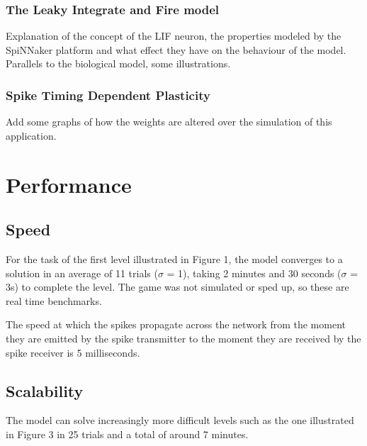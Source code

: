 \documentclass[10pt]{article}
\begin{document}
    \subsubsection{The Leaky Integrate and Fire model}

    Explanation of the concept of the LIF neuron, the properties modeled by the SpiNNaker platform and what effect they have on the behaviour of the model. Parallels to the biological model, some illustrations.

    \subsubsection{Spike Timing Dependent Plasticity}

    Add some graphs of how the weights are altered over the simulation of this application.

    \section{Performance}

    \subsection{Speed}

    For the task of the first level illustrated in Figure 1, the model converges to a solution in an average of 11 trials ($\sigma$ = 1), taking 2 minutes and 30 seconds ($\sigma$ = 3s) to complete the level. The game was not simulated or sped up, so these are real time benchmarks.

    The speed at which the spikes propagate across the network from the moment they are emitted by the spike transmitter to the moment they are received by the spike receiver is 5 milliseconds.

    \subsection{Scalability}

    The model can solve increasingly more difficult levels such as the one illustrated in Figure 3 in 25 trials and a total of around 7 minutes.
\end{document}
